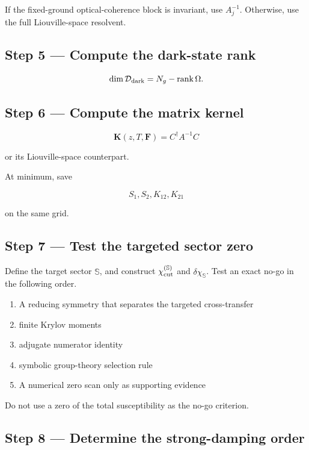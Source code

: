 \documentclass[
  10pt,
  a4paper,
]{article}
\providecommand{\tightlist}{%
  \setlength{\itemsep}{0pt}\setlength{\parskip}{0pt}}
\begin{document}
If the fixed-ground optical-coherence block is invariant, use
\(A_j^{-1}\). Otherwise, use the full Liouville-space resolvent.

\subsection{Step 5 --- Compute the dark-state
rank}\label{step-5-compute-the-dark-state-rank}

\[
\dim\mathcal D_{\rm dark}
=N_g-\operatorname{rank}\Omega.
\]

\subsection{Step 6 --- Compute the matrix
kernel}\label{step-6-compute-the-matrix-kernel}

\[
\mathbf K(z,T,\mathbf F)
=C^\dagger A^{-1}C
\]

or its Liouville-space counterpart.

At minimum, save

\[
S_1,S_2,K_{12},K_{21}
\]

on the same grid.

\subsection{Step 7 --- Test the targeted sector
zero}\label{step-7-test-the-targeted-sector-zero}

Define the target sector \(\mathbb S\), and construct
\(\chi_{\rm cut}^{(\mathbb S)}\) and \(\delta\chi_{\mathbb S}\). Test an
exact no-go in the following order.

\begin{enumerate}
\def\labelenumi{\arabic{enumi}.}
\tightlist
\item
  A reducing symmetry that separates the targeted cross-transfer
\item
  finite Krylov moments
\item
  adjugate numerator identity
\item
  symbolic group-theory selection rule
\item
  A numerical zero scan only as supporting evidence
\end{enumerate}

Do not use a zero of the total susceptibility as the no-go criterion.

\subsection{Step 8 --- Determine the strong-damping
order}\label{step-8-determine-the-strong-damping-order}
\end{document}
